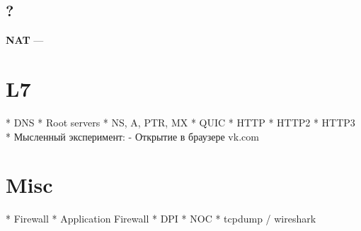 \subsection{?}
\textbf{NAT} --- 


\section{L7}
\todo{}
  * DNS
    * Root servers
    * NS, A, PTR, MX
  * QUIC
  * HTTP
  * HTTP2
  * HTTP3
  * Мысленный эксперимент:
    - Открытие в браузере vk.com

\section{Misc}
\todo{}
  * Firewall
  * Application Firewall
  * DPI
  * NOC
  * tcpdump / wireshark
